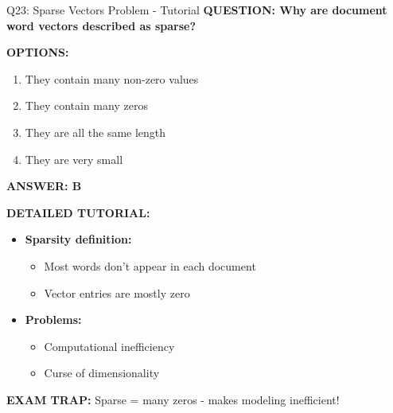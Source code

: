 \documentclass[8pt]{beamer}
\begin{document}
	\begin{frame}{Q23: Sparse Vectors Problem - Tutorial}
		\fontsize{6.5}{7.5}\selectfont
		\textbf{QUESTION: Why are document word vectors described as sparse?}
		
		\vspace{0.1cm}
		\textbf{OPTIONS:}
		\begin{enumerate}
			\item They contain many non-zero values
			\item They contain many zeros
			\item They are all the same length
			\item They are very small
		\end{enumerate}
		
		\vspace{0.1cm}
		\textcolor{myblue}{\textbf{ANSWER: B}}
		
		\vspace{0.1cm}
		\textbf{DETAILED TUTORIAL:}
		\begin{itemize}
			\item \textbf{Sparsity definition:}
			\begin{itemize}
				\item Most words don't appear in each document
				\item Vector entries are mostly zero
			\end{itemize}
			\item \textbf{Problems:}
			\begin{itemize}
				\item Computational inefficiency
				\item Curse of dimensionality
			\end{itemize}
		\end{itemize}
		
		\textcolor{myred}{\textbf{EXAM TRAP:}} Sparse = \textcolor{myblue}{many zeros} - makes modeling inefficient!
	\end{frame}
	
\end{document}

